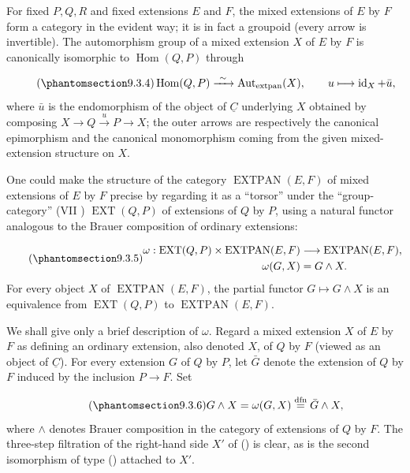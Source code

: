 For fixed $P,Q,R$ and fixed extensions $E$ and $F$, the mixed extensions of
$E$ by $F$ form a category in the evident way; it is in fact a groupoid
(every arrow is invertible). The automorphism group of a mixed extension
$X$ of $E$ by $F$ is canonically isomorphic to $\operatorname{Hom}(Q,P)$
through

\begin{equation}\tag{\SGARefTarget{sga7.sga7i.eix.n9-3-4}{9.3.4}}
\operatorname{Hom}(Q,P)
 \xrightarrow{\ \sim\ }
\operatorname{Aut}_{\mathrm{extpan}}(X),
\qquad
u\longmapsto\operatorname{id}_X+\bar u,
\end{equation}
where $\bar u$ is the endomorphism of the object of $\underline C$
underlying $X$ obtained by composing
$X\longrightarrow Q\xrightarrow{u}P\longrightarrow X$; the outer arrows
are respectively the canonical epimorphism and the canonical monomorphism
coming from the given mixed-extension structure on $X$.

One could make the structure of the category
$\operatorname{EXTPAN}(E,F)$ of mixed extensions of $E$ by $F$ precise by
regarding it as a ``torsor'' under the ``group-category'' (VII )
$\operatorname{EXT}(Q,P)$ of extensions of $Q$ by $P$, using a natural
functor analogous to the Brauer composition of ordinary extensions:

\begin{equation}\tag{\SGARefTarget{sga7.sga7i.eix.n9-3-5}{9.3.5}}
\begin{aligned}
\omega:
\operatorname{EXT}(Q,P)\times\operatorname{EXTPAN}(E,F)
 &\longrightarrow \operatorname{EXTPAN}(E,F),\\
\omega(G,X)&=G\wedge X.
\end{aligned}
\end{equation}
For every object $X$ of $\operatorname{EXTPAN}(E,F)$, the partial functor
$G\longmapsto G\wedge X$ is an equivalence from
$\operatorname{EXT}(Q,P)$ to $\operatorname{EXTPAN}(E,F)$.

We shall give only a brief description of $\omega$. Regard a mixed
extension $X$ of $E$ by $F$ as defining an ordinary extension, also denoted
$X$, of $Q$ by $F$ (viewed as an object of $\underline C$). For every
extension $G$ of $Q$ by $P$, let $\bar G$ denote the extension of $Q$ by
$F$ induced by the inclusion $P\longrightarrow F$. Set

\begin{equation}\tag{\SGARefTarget{sga7.sga7i.eix.n9-3-6}{9.3.6}}
G\wedge X=\omega(G,X)
 \overset{\mathrm{dfn}}{=}\bar G\wedge X,
\end{equation}
where $\wedge$ denotes Brauer composition in the category of extensions of
$Q$ by $F$. The three-step filtration of the right-hand side $X'$ of
() is clear, as is the second isomorphism of type () attached to
$X'$.

